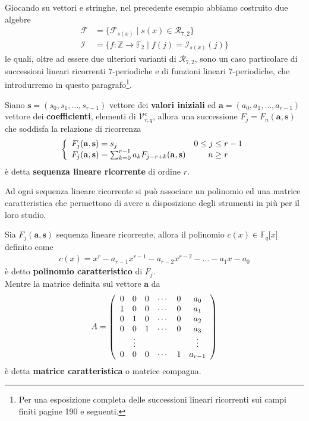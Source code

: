 Giocando su vettori e stringhe, nel precedente esempio abbiamo costruito due algebre
   \begin{align*}
      \mathscr{F} &= \lbrace  \mathscr{F}_{s(x)} \mid s(x) \in \mathcal{R}_{7,2} \rbrace \\ 
      \mathscr{I} &= \lbrace f:\mathbb{Z} \rightarrow  \mathbb{F}_{2} \mid f(j) = \mathscr{I}_{s(x)}(j) \rbrace
   \end{align*}
le quali, oltre ad essere due ulteriori varianti di $\mathcal{R}_{7,2}$, sono un caso particolare di successioni lineari ricorrenti $7$-periodiche e di funzioni lineari $7$-periodiche, che introdurremo in questo paragrafo\footnote{Per una esposizione completa delle successioni lineari ricorrenti sui campi finiti \cite{lidl} pagine 190 e seguenti.}. 
\begin{definizione}
   Siano $\mathbf{s} = (s_0, s_1, \dots , s_{r-1})$ vettore dei {\bf valori iniziali} ed $\mathbf{a} = (a_0, a_1, \dots , a_{r-1})$ vettore dei {\bf coefficienti}, elementi di $\mathcal{V}_{r, q}^{c}$, allora una successione $F_{j} = F_{n}(\mathbf{a},\mathbf{s})$ che soddisfa la relazione di ricorrenza
   \begin{displaymath}
     \left\{ 
     \begin{array}{l c} 
     F_{j}(\mathbf{a},\mathbf{s}) = s_{j} & 0 \leq j \leq r-1 \\
      F_{j}(\mathbf{a},\mathbf{s}) = \sum_{k=0}^{r-1} a_{k} F_{j-r+k}(\mathbf{a},\mathbf{s})  & n \geq r 
     \end{array}
     \right.
     \end{displaymath}
   è detta {\bf sequenza lineare ricorrente} di ordine $r$.
\end{definizione}
Ad ogni sequenza lineare ricorrente si può associare un polinomio ed una matrice caratteristica che permettono di avere a disposizione degli strumenti in più per il loro studio.
\begin{definizione}
   Sia $F_{j}(\mathbf{a},\mathbf{s}) $ sequenza lineare ricorrente, allora il polinomio $c(x) \in \mathbb{F}_{q}\lbrack x \rbrack$ definito come
   \begin{align*}
      c(x)= x^{r} - a_{r-1}x^{r-1} - a_{r-2}x^{r-2} - \dots - a_{1}x - a_{0}
   \end{align*}
   è detto {\bf polinomio caratteristico} di $F_{j}$. \\
   Mentre la matrice definita sul vettore $\mathbf{a}$ da
   \begin{align*}
      A =
      \left(
      \begin{array} {c c c c c c}
      0 & 0 & 0 & \cdots & 0 & a_{0}    \\
      1 & 0 & 0 & \cdots & 0 & a_{1}    \\
      0 & 1 & 0 & \cdots & 0 & a_{2}    \\
      0 & 0 & 1 & \cdots & 0 & a_{3}    \\
       & \vdots  &  &  &  & \vdots    \\
      0 & 0 & 0 & \cdots & 1 & a_{r-1}    \\
      \end{array}
      \right)
    \end{align*}
    è detta {\bf matrice caratteristica} o matrice compagna.
\end{definizione}

